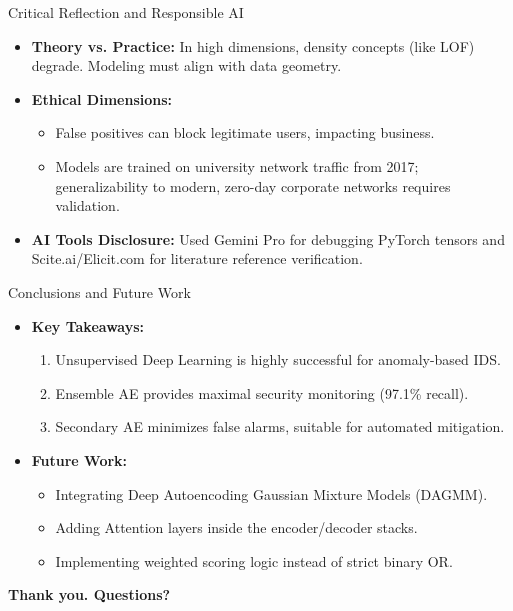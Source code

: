\documentclass[10pt]{beamer}
\begin{document}
\begin{frame}{Critical Reflection and Responsible AI}
  \begin{itemize}
    \item \textbf{Theory vs. Practice:} In high dimensions, density concepts (like LOF) degrade. Modeling must align with data geometry.
    \item \textbf{Ethical Dimensions:}
    \begin{itemize}
      \item False positives can block legitimate users, impacting business.
      \item Models are trained on university network traffic from 2017; generalizability to modern, zero-day corporate networks requires validation.
    \end{itemize}
    \item \textbf{AI Tools Disclosure:} Used Gemini Pro for debugging PyTorch tensors and Scite.ai/Elicit.com for literature reference verification.
  \end{itemize}
\end{frame}

\begin{frame}{Conclusions and Future Work}
  \begin{itemize}
    \item \textbf{Key Takeaways:}
    \begin{enumerate}
      \item Unsupervised Deep Learning is highly successful for anomaly-based IDS.
      \item Ensemble AE provides maximal security monitoring (97.1\% recall).
      \item Secondary AE minimizes false alarms, suitable for automated mitigation.
    \end{enumerate}
    \item \textbf{Future Work:}
    \begin{itemize}
      \item Integrating Deep Autoencoding Gaussian Mixture Models (DAGMM).
      \item Adding Attention layers inside the encoder/decoder stacks.
      \item Implementing weighted scoring logic instead of strict binary OR.
    \end{itemize}
  \end{itemize}
  \vfill
  \centering \textbf{Thank you. Questions?}
\end{frame}
\end{document}

